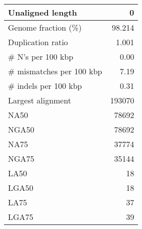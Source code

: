 \documentclass[12pt,a4paper]{article}
\begin{document}
\begin{table}[ht]
\begin{center}
\begin{tabular}{|l*{1}{|r}|}
Unaligned length & 0 \\ \hline
Genome fraction (\%) & 98.214 \\ \hline
Duplication ratio & 1.001 \\ \hline
\# N's per 100 kbp & 0.00 \\ \hline
\# mismatches per 100 kbp & 7.19 \\ \hline
\# indels per 100 kbp & 0.31 \\ \hline
Largest alignment & 193070 \\ \hline
NA50 & 78692 \\ \hline
NGA50 & 78692 \\ \hline
NA75 & 37774 \\ \hline
NGA75 & 35144 \\ \hline
LA50 & 18 \\ \hline
LGA50 & 18 \\ \hline
LA75 & 37 \\ \hline
LGA75 & 39 \\ \hline
\end{tabular}
\end{center}
\end{table}
\end{document}
